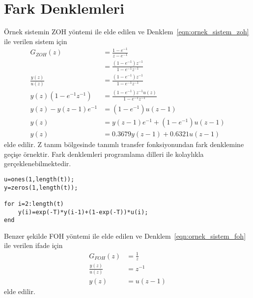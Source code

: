 \chapter{Fark Denklemleri}
Örnek sistemin ZOH yöntemi ile elde edilen ve Denklem~\ref{eqn:ornek_sistem_zoh} ile verilen sistem için
\begin{equation}
\begin{split}
    G_{ZOH}(z)&=\frac{1-e^{-1}}{z-e^{-1}}\\
    &=\frac{(1-e^{-1})z^{-1}}{1-e^{-1}z^{-1}}\\
    \frac{y(z)}{u(z)}&=\frac{(1-e^{-1})z^{-1}}{1-e^{-1}z^{-1}}\\
    y(z)(1-e^{-1}z^{-1})&=\frac{(1-e^{-1})z^{-1}u(z)}{1-e^{-1}z^{-1}}\\
    y(z)-y(z-1)e^{-1}&=(1-e^{-1})u(z-1)\\
    y(z)&=y(z-1)e^{-1}+(1-e^{-1})u(z-1)\\
    y(z)&=0.3679y(z-1)+0.6321u(z-1)
\end{split}
\end{equation}
elde edilir. Z tanım bölgesinde tanımlı transfer fonksiyonundan fark denklemine geçişe örnektir. Fark denklemleri programlama dilleri ile kolaylıkla gerçeklenebilmektedir.
\begin{lstlisting}
u=ones(1,length(t));
y=zeros(1,length(t));

for i=2:length(t)
    y(i)=exp(-T)*y(i-1)+(1-exp(-T))*u(i);
end\end{lstlisting}
Benzer şekilde FOH yöntemi ile elde edilen ve Denklem~\ref{eqn:ornek_sistem_foh} ile verilen ifade için
\begin{equation}
    \begin{split}
        G_{FOH}(z)&=\frac{1}{z}\\
        \frac{y(z)}{u(z)}&=z^{-1}\\
        y(z)&=u(z-1)
    \end{split}
\end{equation}
elde edilir.